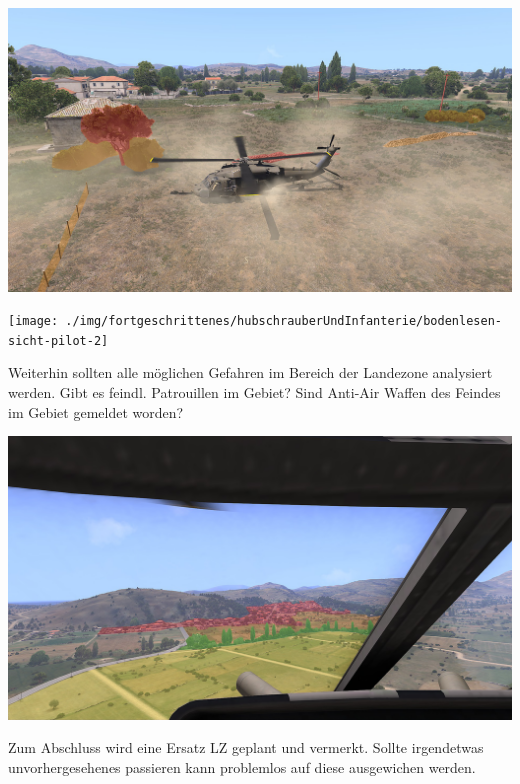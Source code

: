 	\begin{minipage}[t]{1\textwidth}
		\includegraphics[width=\textwidth]{./img/fortgeschrittenes/hubschrauberUndInfanterie/bodenlesen-sicht-pilot}
	\end{minipage}

	\begin{minipage}[t]{1\textwidth}
		\texttt{[image: ./img/fortgeschrittenes/hubschrauberUndInfanterie/bodenlesen-sicht-pilot-2]}
	\end{minipage}	

	Weiterhin sollten alle möglichen Gefahren im Bereich der Landezone analysiert werden. Gibt es feindl. Patrouillen im Gebiet? Sind Anti-Air Waffen des Feindes im Gebiet gemeldet worden? \\

	\begin{minipage}[t]{1\textwidth}
		\includegraphics[width=\textwidth]{./img/fortgeschrittenes/hubschrauberUndInfanterie/sicht-pilot}
	\end{minipage}	
			
	Zum Abschluss wird eine Ersatz \ac{LZ} geplant und vermerkt. Sollte irgendetwas unvorhergesehenes passieren kann problemlos auf diese ausgewichen werden.


